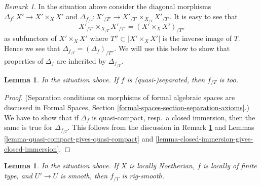 \documentclass{stacks-project}
\theoremstyle{plain}
\newtheorem{lemma}[subsection]{Lemma}
\theoremstyle{definition}
\theoremstyle{remark}
\newtheorem{remark}[subsection]{Remark}
\numberwithin{equation}{subsection}
\begin{document}
\begin{remark}
\label{remark-diagonal-gives-diagonal}
In the situation above consider the diagonal morphisms
$\Delta_f : X' \to X' \times_X X'$ and
$\Delta_{f_{/T}} : X'_{/T'} \to X'_{/T'} \times_{X_{/T}} X'_{/T'}$.
It is easy to see that
$$
X'_{/T'} \times_{X_{/T}} X'_{/T'} = (X' \times_X X')_{/T''}
$$
as subfunctors of $X' \times_X X'$ where $T'' \subset |X' \times_X X'|$
is the inverse image of $T$. Hence we see that
$\Delta_{f_{/T}} = (\Delta_f)_{/T''}$. We will use this below
to show that properties of $\Delta_f$ are inherited by $\Delta_{f_{/T}}$.
\end{remark}

\begin{lemma}
\label{lemma-quasi-separated-gives-quasi-separated}
In the situation above. If $f$ is (quasi-)separated, then
$f_{/T}$ is too.
\end{lemma}

\begin{proof}
(Separation conditions on morphisms of formal algebraic spaces are discussed in
Formal Spaces, Section
\ref{formal-spaces-section-separation-axioms}.)
We have to show that if $\Delta_f$ is quasi-compact, resp.\ a closed immersion,
then the same is true for $\Delta_{f_{/T}}$. This follows from the discussion
in Remark \ref{remark-diagonal-gives-diagonal} and
Lemmas \ref{lemma-quasi-compact-gives-quasi-compact} and
\ref{lemma-closed-immersion-gives-closed-immersion}.
\end{proof}

\begin{lemma}
\label{lemma-smooth-gives-rig-smooth}
In the situation above. If $X$ is locally Noetherian,
$f$ is locally of finite type, and $U' \to U$ is smooth, then
$f_{/T}$ is rig-smooth.
\end{lemma}
\end{document}
